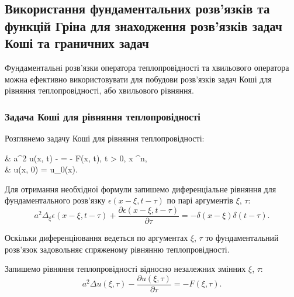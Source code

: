 \subsection{Використання фундаментальних розв'язків та \allowbreak функцій Гріна для знаходження розв'язків задач Коші та граничних задач}

Фундаментальні розв'язки оператора теплопровідності та хвильового оператора можна ефективно  використовувати для побудови розв'язків задач Коші для рівняння теплопровідності, або хвильового рівняння.

\subsubsection{Задача Коші для рівняння теплопровідності}

\begin{example}
	Розглянемо задачу Коші для рівняння теплопровідності:
	\begin{system}
		& a^2 \Delta u(x, t) -  = - F(x, t), \quad t > 0, \quad x \in \RR^n, \\
		& u(x, 0) = u_0(x).
	\end{system}
\end{example}

Для отримання необхідної формули запишемо диференціальне рівняння для фундаментального розв'язку $\epsilon(x - \xi, t - \tau)$ по парі аргументів $\xi$, $\tau$:
\begin{equation}
	\label{eq:3.3.2}
	a^2 \Delta_\xi \epsilon(x - \xi, t - \tau) + \frac{\partial \epsilon(x - \xi, t - \tau)}{\partial \tau} = - \delta(x - \xi) \delta(t - \tau).
\end{equation}

\begin{remark}
	Оскільки диференціювання ведеться по аргументах $\xi$, $\tau$ то фундаментальний розв'язок задовольняє спряженому рівнянню теплопровідності.
\end{remark}

Запишемо рівняння теплопровідності відносно незалежних змінних $\xi$, $\tau$:
\begin{equation}
	a^2 \Delta u(\xi, \tau) - \frac{\partial u(\xi, \tau)}{\partial \tau} = - F(\xi, \tau).
\end{equation}

